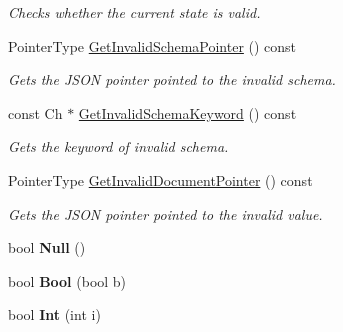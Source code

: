 \begin{DoxyCompactItemize}
\begin{DoxyCompactList}\small\item\em Checks whether the current state is valid. \end{DoxyCompactList}\item 
Pointer\+Type \hyperlink{classGenericSchemaValidator_a39879de53c70fd5d3c018b61d1235681}{Get\+Invalid\+Schema\+Pointer} () const \hypertarget{classGenericSchemaValidator_a39879de53c70fd5d3c018b61d1235681}{}\label{classGenericSchemaValidator_a39879de53c70fd5d3c018b61d1235681}

\begin{DoxyCompactList}\small\item\em Gets the J\+S\+ON pointer pointed to the invalid schema. \end{DoxyCompactList}\item 
const Ch $\ast$ \hyperlink{classGenericSchemaValidator_a016b23047ed66bac570e378fbaaf839b}{Get\+Invalid\+Schema\+Keyword} () const \hypertarget{classGenericSchemaValidator_a016b23047ed66bac570e378fbaaf839b}{}\label{classGenericSchemaValidator_a016b23047ed66bac570e378fbaaf839b}

\begin{DoxyCompactList}\small\item\em Gets the keyword of invalid schema. \end{DoxyCompactList}\item 
Pointer\+Type \hyperlink{classGenericSchemaValidator_ae65727ef84d82f3e31e1f57543e71320}{Get\+Invalid\+Document\+Pointer} () const \hypertarget{classGenericSchemaValidator_ae65727ef84d82f3e31e1f57543e71320}{}\label{classGenericSchemaValidator_ae65727ef84d82f3e31e1f57543e71320}

\begin{DoxyCompactList}\small\item\em Gets the J\+S\+ON pointer pointed to the invalid value. \end{DoxyCompactList}\item 
bool {\bfseries Null} ()\hypertarget{classGenericSchemaValidator_a7137af73e934f50c66cbb8a9aa802ea6}{}\label{classGenericSchemaValidator_a7137af73e934f50c66cbb8a9aa802ea6}

\item 
bool {\bfseries Bool} (bool b)\hypertarget{classGenericSchemaValidator_aa25fa7456f2f308a105e400f01a4afde}{}\label{classGenericSchemaValidator_aa25fa7456f2f308a105e400f01a4afde}

\item 
bool {\bfseries Int} (int i)\hypertarget{classGenericSchemaValidator_ad823c29990225661a4df69d34647b659}{}\label{classGenericSchemaValidator_ad823c29990225661a4df69d34647b659}


\end{DoxyCompactItemize}
